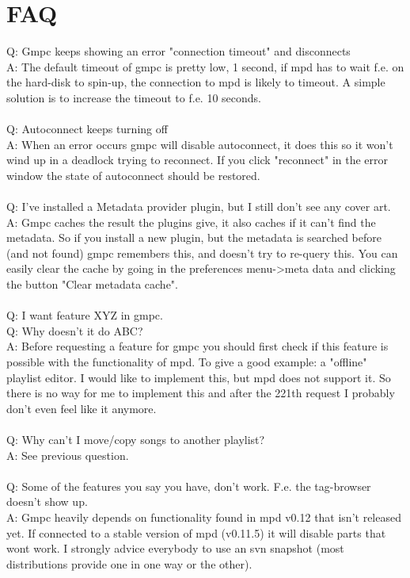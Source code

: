 \documentclass{article}
\begin{document}
\section{FAQ}
Q: Gmpc keeps showing an error "connection timeout" and disconnects\\
A: The default timeout of gmpc is pretty low, 1 second, if mpd has to wait f.e. on the hard-disk to spin-up, the connection to mpd is likely to timeout. A simple solution is to increase the timeout to f.e. 10 seconds.\\
\\
Q: Autoconnect keeps turning off\\
A: When an error occurs gmpc will disable autoconnect, it does this so it won't wind up in a deadlock trying to reconnect. If you click "reconnect" in the error window the state of autoconnect should be restored.\\
\\
Q: I've installed a Metadata provider plugin, but I still don't see any cover art.\\
A: Gmpc caches the result the plugins give, it also caches if it can't find the metadata. So if you install a new plugin, but the metadata is searched before (and not found) gmpc remembers this, and doesn't try to re-query this. You can easily clear the cache by going in the preferences menu->meta data and clicking the button "Clear metadata cache".\\
\\
Q: I want feature XYZ in gmpc.\\
Q: Why doesn't it do ABC?\\
A: Before requesting a feature for gmpc you should first check if this feature is possible with the functionality of mpd. To give a good example: a "offline" playlist editor. I would like to implement this, but mpd does not support it. So there is no way for me to implement this and after the 221th request I probably don't even feel like it anymore.\\
\\
Q: Why can't I move/copy songs to another playlist?\\
A: See previous question.\\
\\
Q: Some of the features you say you have, don't work. F.e. the tag-browser doesn't show up.\\
A: Gmpc heavily depends on functionality found in mpd v0.12 that isn't released yet. If connected to a stable version of mpd (v0.11.5) it will disable parts that wont work. I strongly advice everybody to use an svn snapshot (most distributions provide one in one way or the other).\\
\end{document}
